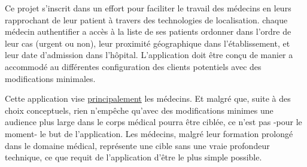 Ce projet s'inscrit dans un effort pour faciliter le travail des médecins en
leurs rapprochant de leur patient à travers des technologies de localisation.
chaque médecin authentifier a accès à la liste de ses patients ordonner dans
l'ordre de leur cas (urgent ou non), leur proximité géographique dans
l’établissement, et leur date d’admission dans l'hôpital. L'application doit
être conçu de manier a accommodé au différentes configuration des clients
potentiels avec des modifications minimales.

Cette application vise \underline{principalement} les médecins. Et
malgré que, suite à des choix conceptuels, rien n’empêche qu’avec des
modifications minimes une audience plus large dans le corps médical
pourra être ciblée, ce n’est pas -pour le moment- le but de
l’application. Les médecins, malgré leur formation prolongé dans le
domaine médical, représente une cible sans une vraie profondeur
technique, ce que requit de l’application d’être le plus simple
possible.
